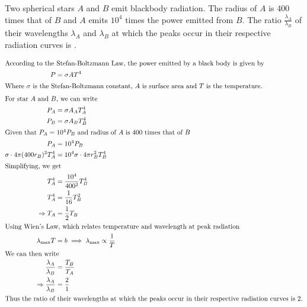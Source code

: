 
\item Two spherical stars \( A \) and \( B \) emit blackbody radiation. The radius of \( A \) is 400 times that of \( B \) and \( A \) emits \( 10^4 \) times the power emitted from \( B \). The ratio \(\frac{{\lambda_A}}{{\lambda_B}}\) of their wavelengths \( \lambda_A \) and \( \lambda_B \) at which the peaks occur in their respective radiation curves is \underline{\hspace{2.5 cm}}.

\begin{solution}
    \begin{align*}
        \intertext{According to the Stefan-Boltzmann Law, the power emitted by a black body is given by}
        P &= \sigma A T^4 \\
        \intertext{Where $\sigma$ is the Stefan-Boltzmann constant, $A$ is surface area and $T$ is the temperature.}
        \intertext{For star $A$ and $B$, we can write}
        P_A &= \sigma A_A T_A^4 \\
        P_B &= \sigma A_B T_B^4 \\
        \intertext{Given that $P_A = 10^4 P_B$ and radius of $A$ is $400$ times that of $B$}
        P_A &= 10^4 P_B \\
        \sigma \cdot 4 \pi (400r_B)^2 T_A^4 &= 10^4 \sigma \cdot 4 \pi r_B^2 T_B^4 \\
        \intertext{Simplifying, we get}
        T_A^4 &= \frac{10^4}{400^2} T_B^4 \\
        T_A^4 &= \frac{1}{16} T_B^2 \\
        \Rightarrow T_A &= \frac{1}{2} T_B \\
        \intertext{Using Wien's Law, which relates temperature and wavelength at peak radiation}
        \lambda_{\text{max}} T &= b \implies \lambda_{\text{max}} \propto \frac{1}{T} \\
        \intertext{We can then write}
        \frac{\lambda_A}{\lambda_B} &= \frac{T_B}{T_A} \\
        \Rightarrow \frac{\lambda_A}{\lambda_B} &= \frac{2}{1} \\
        \intertext{Thus the ratio of their wavelengths at which the peaks occur in their respective radiation curves is 2.}
    \end{align*}
\end{solution}

